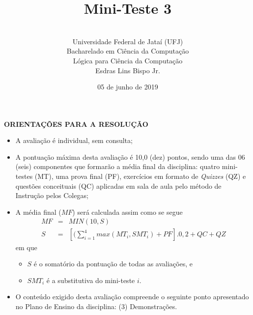 \documentclass[12pt,a4paper,oneside]{article}
\author{\\Universidade Federal de Jataí (UFJ)\\Bacharelado em Ciência da Computação \\Lógica para Ciência da Computação \\Esdras Lins Bispo Jr.}
\date{05 de junho de 2019}
\title{\sc \huge Mini-Teste 3}
\begin{document}
\maketitle

{\bf ORIENTAÇÕES PARA A RESOLUÇÃO}

\small
 
\begin{itemize}
	\item A avaliação é individual, sem consulta;
	\item A pontuação máxima desta avaliação é 10,0 (dez) pontos, sendo uma das 06 (seis) componentes que formarão a média final da disciplina: quatro mini-testes (MT), uma prova final (PF), exercícios em formato de {\it Quizzes} (QZ) e questões conceituais (QC) aplicadas em sala de aula pelo método de Instrução pelos Colegas;
	\item A média final ($MF$) será calculada assim como se segue
	\begin{eqnarray}
		MF & = & MIN(10, S) \nonumber \\
		S & = & [(\sum_{i=1}^{4} max(MT_i, SMT_i ) + PF].0,2  + QC + QZ\nonumber
	\end{eqnarray}
	em que 
	\begin{itemize}
		\item $S$ é o somatório da pontuação de todas as avaliações, e
		\item $SMT_i$ é a substitutiva do mini-teste $i$.
	\end{itemize}
	\item O conteúdo exigido desta avaliação compreende o seguinte ponto apresentado no Plano de Ensino da disciplina: (3) Demonstrações.
\end{itemize}

\begin{center}
\end{center}

\newpage
\end{document}
